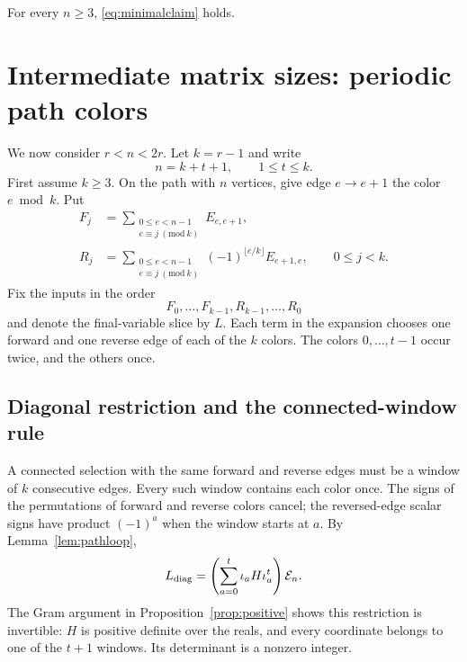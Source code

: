 \begin{corollary}\label{cor:minimal}
For every $n\ge3$, \eqref{eq:minimalclaim} holds.
\end{corollary}

\section{Intermediate matrix sizes: periodic path colors}
\label{sec:middle}
We now consider $r<n<2r$. Let $k=r-1$ and write
\begin{equation}\label{eq:kt}
 n=k+t+1,\qquad 1\le t\le k.
\end{equation}
First assume $k\ge3$. On the path with $n$ vertices, give
edge $e\to e+1$ the color $e\bmod k$. Put
\begin{equation}\label{eq:periodic}
\begin{split}
 F_j&=\sum_{\substack{0\le e<n-1\\e\equiv j\ (\mathrm{mod}\ k)}}
 E_{e,e+1},\\
 R_j&=\sum_{\substack{0\le e<n-1\\e\equiv j\ (\mathrm{mod}\ k)}}
 (-1)^{\lfloor e/k\rfloor}E_{e+1,e},\qquad 0\le j<k.
\end{split}
\end{equation}
Fix the inputs in the order
\begin{equation}\label{eq:periodorder}
 F_0,\ldots,F_{k-1},R_{k-1},\ldots,R_0
\end{equation}
and denote the final-variable slice by $L$.
Each term in the expansion chooses one forward and one reverse edge
of each of the $k$ colors. The colors $0,\ldots,t-1$ occur twice,
and the others once.

\subsection{Diagonal restriction and the connected-window rule}
A connected selection with the same forward and reverse edges must
be a window of $k$ consecutive edges. Every such window contains
each color once. The signs of the permutations of forward and
reverse colors cancel; the reversed-edge scalar signs have product
$(-1)^a$ when the window starts at $a$. By
Lemma~\ref{lem:pathloop},
\begin{equation}\label{eq:perdiag}
 L_{\rm diag}=\left(\sum_{a=0}^{t}
 \iota_a H\iota_a^t\right)\mathcal E_n.
\end{equation}
The Gram argument in Proposition~\ref{prop:positive} shows this
restriction is invertible: $H$ is positive definite over the reals,
and every coordinate belongs to one of the $t+1$ windows. Its
determinant is a nonzero integer.

